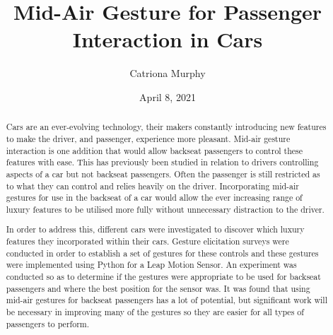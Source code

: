 \documentclass{l4proj}
\begin{document}
\title{Mid-Air Gesture for Passenger Interaction in Cars} %
\author{Catriona Murphy}
\date{April 8, 2021}

\maketitle

\begin{abstract}
    Cars are an ever-evolving technology, their makers constantly introducing new features to make the driver, and passenger, experience more pleasant. Mid-air gesture interaction is one addition that would allow backseat passengers to control these features with ease.  This has previously been studied in relation to drivers controlling aspects of a car but not backseat passengers. Often the passenger is still restricted as to what they can control and relies heavily on the driver. Incorporating mid-air gestures for use in the backseat of a car would allow the ever increasing range of luxury features to be utilised more fully without unnecessary distraction to the driver.
    
    In order to address this, different cars were investigated to discover which luxury features they incorporated within their cars. Gesture elicitation surveys were conducted in order to establish a set of gestures for these controls and these gestures were implemented using Python for a Leap Motion Sensor. An experiment was conducted so as to determine if the gestures were appropriate to be used for backseat passengers and where the best position for the sensor was. It was found that using mid-air gestures for backseat passengers has a lot of potential, but significant work will be necessary in improving many of the gestures so they are easier for all types of passengers to perform.
\end{abstract}

%
%
\end{document}

